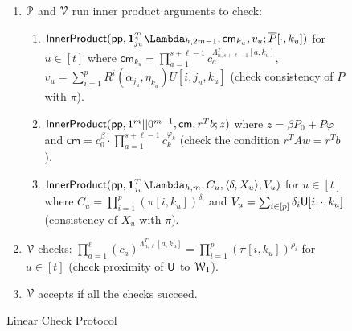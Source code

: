 \begin{figure}[h!]
{\begin{framed}
\begin{enumerate}[{\rm 1.}]
				\item $\mathcal{P}$ and $\mathcal{V}$ run inner product arguments to check:
				\begin{enumerate}
					\item $\innerproduct(\mathsf{pp},\bm{1}_{j_u}^T\Lambda_{h,2m-1},\mathsf{cm}_{k_u},v_u;\overline{P}[\cdot,k_u])$ for $u\in [t]$ where $\mathsf{cm}_{k_u}=\prod_{a=1}^{s+\ell-1}c_a^{\Lambda^T_{n,s+\ell-1}[a,k_u]}$, $v_u=\sum_{i=1}^pR^i(\alpha_{j_u},\eta_{k_u})U[i,j_u,k_u]$ (check consistency of $P$ with $\pi$).
					\item $\mathsf{InnerProduct}(\mathsf{pp},1^m||0^{m-1},\mathsf{cm},r^Tb;z)$ where $z=\beta P_0+\overline{P}\varphi$ and $\mathsf{cm}=c_0^{\beta}\cdot \prod_{a=1}^{s+\ell-1}c_k^{\varphi_k}$ (check the condition $r^TAw=r^Tb$).
					\item $\innerproduct(\mathsf{pp},\bm{1}_{j_u}^T\Lambda_{h,m},C_u,\innp{\delta}{X_u}; V_u)$ for $u\in [t]$ 
					where $C_u=\prod_{i=1}^p(\pi[i,k_u])^{\delta_i}$ and $V_u=\sum_{i\in[p]} \delta_i\mathsf{U}[i,\cdot,k_u]$ (consistency of $X_u$ with $\pi$). 
				\end{enumerate}
				\item $\mathcal{V}$ checks: $\prod_{a=1}^\ell(\tilde{c}_a)^{\Lambda^T_{n,\ell}[a,k_u]}=\prod_{i=1}^p(\pi[i,k_u])^{\rho_i}$ for $u\in [t]$ (check proximity of $\mathsf{U}$ to $\mathcal{W}_1$).
				\item $\mathcal{V}$ accepts if all the checks succeed.
			\end{enumerate}
		\end{framed}
		\vspace{-0.4cm}
		\caption{Linear Check Protocol}
		\label{fig:linearcheck}
	}
\end{figure}

